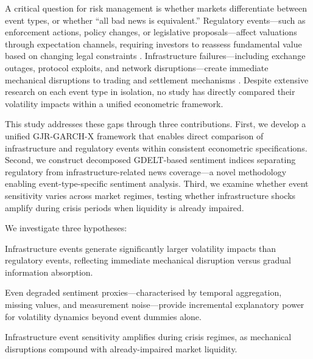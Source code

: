 \documentclass[pdflatex,sn-mathphys-num]{sn-jnl}
\theoremstyle{thmstyleone}
\theoremstyle{thmstyletwo}
\theoremstyle{thmstylethree}
\begin{document}
A critical question for risk management is whether markets differentiate between event types, or whether ``all bad news is equivalent.'' Regulatory events---such as enforcement actions, policy changes, or legislative proposals---affect valuations through expectation channels, requiring investors to reassess fundamental value based on changing legal constraints \citep{AuerClaessens2018, FeinsteinWerbach2021}. Infrastructure failures---including exchange outages, protocol exploits, and network disruptions---create immediate mechanical disruptions to trading and settlement mechanisms \citep{ChenEtAl2023, Grobys2021}. Despite extensive research on each event type in isolation, no study has directly compared their volatility impacts within a unified econometric framework.

This study addresses these gaps through three contributions. First, we develop a unified GJR-GARCH-X framework that enables direct comparison of infrastructure and regulatory events within consistent econometric specifications. Second, we construct decomposed GDELT-based sentiment indices separating regulatory from infrastructure-related news coverage---a novel methodology enabling event-type-specific sentiment analysis. Third, we examine whether event sensitivity varies across market regimes, testing whether infrastructure shocks amplify during crisis periods when liquidity is already impaired.

We investigate three hypotheses:

\begin{description}[leftmargin=0pt,labelindent=0pt]
\item[H1: Asymmetric Event Impact.] Infrastructure events generate significantly larger volatility impacts than regulatory events, reflecting immediate mechanical disruption versus gradual information absorption.

\item[H2: Sentiment Explanatory Power.] Even degraded sentiment proxies---characterised by temporal aggregation, missing values, and measurement noise---provide incremental explanatory power for volatility dynamics beyond event dummies alone.

\item[H3: Crisis Amplification.] Infrastructure event sensitivity amplifies during crisis regimes, as mechanical disruptions compound with already-impaired market liquidity.
\end{description}
\end{document}
